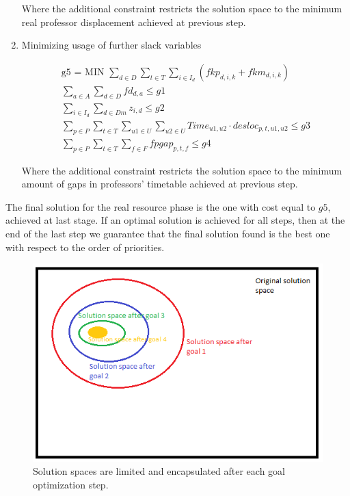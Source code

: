\begin{enumerate}
Where the additional constraint restricts the solution space to the minimum real professor displacement achieved at previous step.

\item{Minimizing usage of further slack variables}

\begin{align*}
   \mbox{g5 = MIN  } \sum\limits_{d \in D} \sum\limits_{t \in T} \sum\limits_{i \in I_{d}} (fkp_{d,i,k} + fkm_{d,i,k})
	\\
	\sum\limits_{a \in A}\sum\limits_{d \in D} fd_{d,a} \le g1
	\\
	\sum\limits_{i \in I_{d}} \sum\limits_{d \in Dm} z_{i,d} \le g2
	\\
	\sum\limits_{p \in P} \sum\limits_{t \in T} \sum\limits_{u1 \in U} \sum\limits_{u2 \in U} Time_{u1,u2} \cdot desloc_{p,t,u1,u2} \le g3
	\\
	\sum\limits_{p \in P} \sum\limits_{t \in T} \sum\limits_{f \in F} fpgap_{p,t,f} \le g4
\end{align*}

Where the additional constraint restricts the solution space to the minimum amount of gaps in professors' timetable achieved at previous step.

\end{enumerate}


The final solution for the real resource phase is the one with cost equal to $g5$, achieved at last stage. If an optimal solution is achieved for all steps, then at the end of the last step we guarantee that the final solution found is the best one with respect to the order of priorities.

\begin{figure}[H]
\includegraphics[scale=0.6]{figures/goalProgSpace.png}
\centering
\caption{Solution spaces are limited and encapsulated after each goal optimization step.}
\end{figure}

